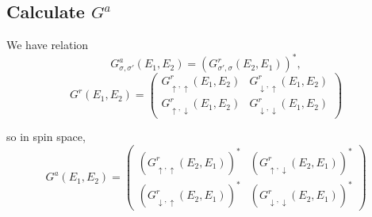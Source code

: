 \documentclass[11pt,a4paper]{article}
\begin{document}
\subsection{Calculate $G^{a}$}
We have relation
\begin{equation}
G_{\sigma,\sigma'}^{a}\left(E_{1}, E_{2}\right)=(G_{\sigma',\sigma}^{r}\left(E_{2}, E_{1}\right))^{*},
\end{equation}
\begin{equation}
G^{r}(E_{1},E_{2})=\left(\begin{array}{cc}
G_{\uparrow,\uparrow}^{r}(E_{1},E_{2}) & G_{\downarrow,\uparrow}^{r}(E_{1},E_{2}) \\
G_{\uparrow,\downarrow}^{r}(E_{1},E_{2}) & G_{\downarrow,\downarrow}^{r}(E_{1},E_{2})
\end{array}\right)
\end{equation}

so in spin space, 
\begin{equation}
G^{a}(E_{1},E_{2})=\left(\begin{array}{cc}
(G_{\uparrow,\uparrow}^{r}(E_{2},E_{1}))^{*} & (G_{\uparrow,\downarrow}^{r}(E_{2},E_{1}))^{*} \\
(G_{\downarrow,\uparrow}^{r}(E_{2},E_{1}))^{*} & (G_{\downarrow,\downarrow}^{r}(E_{2},E_{1}))^{*}
\end{array}\right)
\end{equation}
\end{document}
